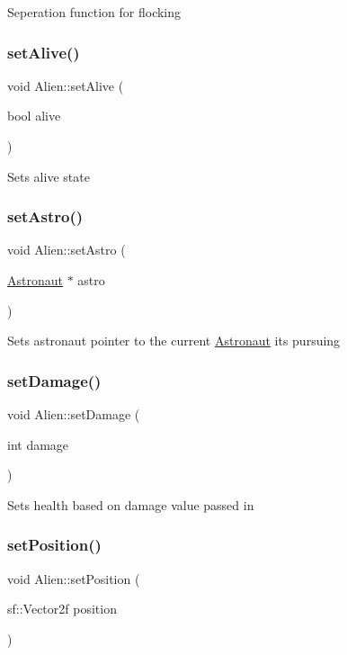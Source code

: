 Seperation function for flocking \mbox{\label{class_alien_a1f8e8072e38c88e7299867ce08e169f4}} 
\subsubsection{\texorpdfstring{set\+Alive()}{setAlive()}}
{\footnotesize\ttfamily void Alien\+::set\+Alive (\begin{DoxyParamCaption}\item[{bool}]{alive }\end{DoxyParamCaption})}

Sets alive state \mbox{\label{class_alien_a23b7f6d84b71e233834a36ee37e90b14}} 
\subsubsection{\texorpdfstring{set\+Astro()}{setAstro()}}
{\footnotesize\ttfamily void Alien\+::set\+Astro (\begin{DoxyParamCaption}\item[{\hyperlink{class_astronaut}{Astronaut} $\ast$}]{astro }\end{DoxyParamCaption})}

Sets astronaut pointer to the current \hyperlink{class_astronaut}{Astronaut} its pursuing \mbox{\label{class_alien_a5f1364d7d592e43230971365bb58d5a3}} 
\subsubsection{\texorpdfstring{set\+Damage()}{setDamage()}}
{\footnotesize\ttfamily void Alien\+::set\+Damage (\begin{DoxyParamCaption}\item[{int}]{damage }\end{DoxyParamCaption})}

Sets health based on damage value passed in \mbox{\label{class_alien_a751c54dcc0d77d92c6540b05b0fef50a}} 
\subsubsection{\texorpdfstring{set\+Position()}{setPosition()}}
{\footnotesize\ttfamily void Alien\+::set\+Position (\begin{DoxyParamCaption}\item[{sf\+::\+Vector2f}]{position }\end{DoxyParamCaption})}

